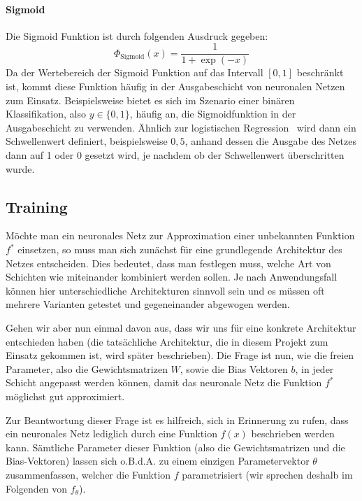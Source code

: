 \paragraph{Sigmoid} Die Sigmoid Funktion ist durch folgenden Ausdruck gegeben:
\begin{equation*}
    \Phi_\text{Sigmoid}(x) = \frac{1}{1 + \exp{(-x)}}
\end{equation*}
Da der Wertebereich der Sigmoid Funktion auf das Intervall $[0, 1]$
beschr\"ankt ist, kommt diese Funktion h\"aufig in der Ausgabeschicht
von neuronalen Netzen zum Einsatz. Beispielsweise bietet es sich im
Szenario einer bin\"aren Klassifikation, also $y \in \{0, 1\}$, h\"aufig
an, die Sigmoidfunktion in der Ausgabeschicht zu verwenden.
\"Ahnlich zur logistischen Regression~\cite{statistical_learning}
wird dann ein Schwellenwert definiert, beispielsweise $0,5$, anhand
dessen die Ausgabe des Netzes dann auf 1 oder 0 gesetzt wird, je nachdem
ob der Schwellenwert \"uberschritten wurde.

\subsection{Training}
\label{sec:training}

M\"ochte man ein neuronales Netz zur Approximation einer unbekannten
Funktion $f^*$ einsetzen, so muss man sich zun\"achst f\"ur eine
grundlegende Architektur des Netzes entscheiden.
Dies bedeutet, dass man festlegen muss, welche Art von Schichten wie
miteinander kombiniert werden sollen.
Je nach Anwendungsfall k\"onnen hier unterschiedliche Architekturen
sinnvoll sein und es m\"ussen oft mehrere Varianten getestet und
gegeneinander abgewogen werden.

Gehen wir aber nun einmal davon aus, dass wir uns f\"ur eine konkrete
Architektur entschieden haben (die tats\"achliche Architektur, die in
diesem Projekt zum Einsatz gekommen ist, wird sp\"ater beschrieben).
Die Frage ist nun, wie die freien Parameter, also die
Gewichtsmatrizen $W$, sowie die Bias Vektoren $b$, in jeder Schicht angepasst
werden k\"onnen, damit das neuronale Netz die Funktion $f^*$ m\"oglichst
gut approximiert.

Zur Beantwortung dieser Frage ist es hilfreich, sich in Erinnerung
zu rufen, dass ein neuronales Netz lediglich durch eine Funktion
$f(x)$ beschrieben werden kann.
S\"amtliche Parameter dieser Funktion (also die Gewichtsmatrizen und
die Bias-Vektoren) lassen sich o.B.d.A. zu einem einzigen
Parametervektor $\theta$ zusammenfassen, welcher die Funktion $f$
parametrisiert (wir sprechen deshalb im Folgenden von $f_\theta$).

